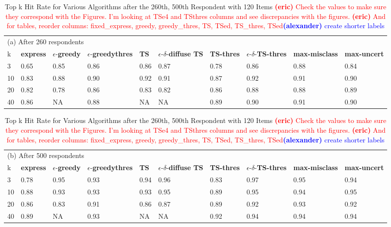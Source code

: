 \documentclass[nonblindrev]{informs3}
\newcommand{\alexander}[1]{\textcolor{blue}{\textbf{(alexander)} #1}}
\newcommand{\eric}[1]{\textcolor{red}{\textbf{(eric)} #1}}
\newcommand{\fixedexpress}{\textbf{express}}
\newcommand{\egreedy}{$\epsilon$-\textbf{greedy}}
\newcommand{\egreedythres}{$\epsilon$-\textbf{greedythres}}
\newcommand{\mismin}{\textbf{max-misclass}}
\newcommand{\ts}{\textbf{TS} }
\newcommand{\edts}{$\epsilon$-$\delta$-\textbf{diffuse TS} }
\newcommand{\tsthres}{\textbf{TS-thres} }
\newcommand{\edtsthres}{$\epsilon$-$\delta$-\textbf{TS-thres} }
\newcommand{\uncert}{\textbf{max-uncert} }
\begin{document}
\begin{table}
\caption{Top k Hit Rate for Various Algorithms after the {260th, 500th} Respondent with 120 Items \eric{Check the values to make sure they correspond with the Figures. I'm looking at TSe4 and TSthres columns and see discrepancies with the figures.} \eric{And for tables, reorder columns: fixed\_express, greedy, greedy\_thres, TS, TSed, TS\_thres, TSed}\alexander{create shorter labels}
 }
\label{table:at_260_500}
\begin{center}
\begin{tabular}{llllllllll}
\hline 
\hline
\multicolumn{10}{l}{(a) After 260 respondents}\\
k &  \fixedexpress&\egreedy&\egreedythres&\ts&\edts&\tsthres&\edtsthres& \mismin& \uncert \\ \hline
  3 & 0.65 &   0.85 &  0.86 &   0.86 & 0.87 & 0.78 & 0.86 &    0.88 &   0.84 \\
  10 &  0.83 &   0.88 & 0.90 &   0.92 & 0.91 & 0.87 & 0.92 &    0.91 &   0.90 \\
  20 & 0.82 & 0.78 &  0.86 & 0.83 & 0.82 & 0.86 & 0.88 &  0.88 &   0.89 \\  
  40 &  0.86 &   NA &  0.88 &  NA & NA & 0.89 & 0.90 &  0.91 &   0.90 \\
\hline
\hline
\end{tabular}
\begin{tabular}{llllllllll}
\multicolumn{10}{l}{(b) After 500 respondents}\\
k &  \fixedexpress&\egreedy&\egreedythres&\ts&\edts&\tsthres&\edtsthres& \mismin& \uncert  \\
\hline
   3 & 0.78 &   0.95 & 0.93 & 0.94 & 0.96 & 0.83 & 0.97 &    0.95 &   0.94 \\
  10 &  0.88 &   0.93 &  0.93 &   0.93 & 0.95 & 0.89 & 0.95 &    0.94 &   0.95 \\  
  20 &  0.86 &   0.83 & 0.91 &  0.86 & 0.87 & 0.89 & 0.92 &  0.93 &   0.92 \\ 
  40 &  0.89 &   NA & 0.93 & NA & NA & 0.92 &  0.94 & 0.94 & 0.94 \\
\hline 
\hline
\end{tabular}
\end{center}
\end{table}
\end{document}
